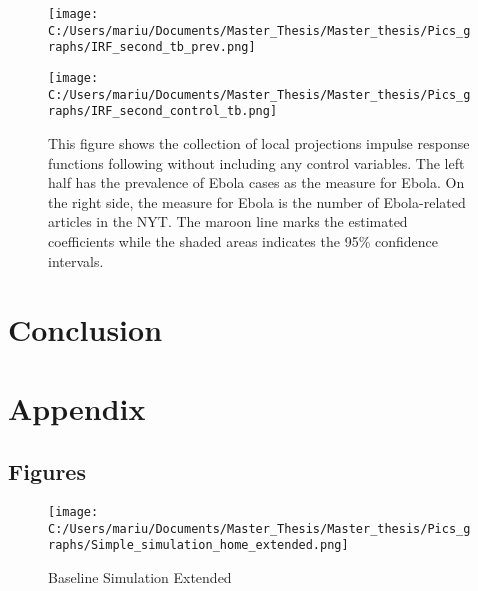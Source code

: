 \documentclass{article}
\begin{document}
\begin{figure}[!ht] 
\begin{minipage}[t]{0.5\linewidth}\vspace{0pt} 
\texttt{[image: C:/Users/mariu/Documents/Master\_Thesis/Master\_thesis/Pics\_graphs/IRF\_second\_tb\_prev.png]}\\
\end{minipage}\hfill%
\begin{minipage}[t]{0.5\linewidth}\vspace{0pt} 
\texttt{[image: C:/Users/mariu/Documents/Master\_Thesis/Master\_thesis/Pics\_graphs/IRF\_second\_control\_tb.png]}\\
\end{minipage}\hfill%
\caption{This figure shows the collection of local projections impulse response functions following \cite{jorda2005estimation} without including any control variables. The left half has the prevalence of Ebola cases as the measure for Ebola. On the right side, the measure for Ebola is the number of Ebola-related articles in the NYT. The maroon line marks the estimated coefficients while the shaded areas indicates the 95\% confidence intervals.}
\label{IRF - Trade Balance}
\end{figure}

\section{Conclusion}


\pagebreak




\pagebreak
\section{Appendix}


\subsection*{Figures}
\begin{figure}[!ht]
\begin{center}\caption{Baseline Simulation Extended \label{Baseline Simulation Extended}}
\texttt{[image: C:/Users/mariu/Documents/Master\_Thesis/Master\_thesis/Pics\_graphs/Simple\_simulation\_home\_extended.png]}\\
\end{center}
\end{figure}
\end{document}
